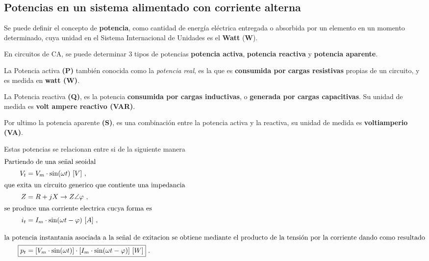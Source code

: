 \subsection{Potencias en un sistema alimentado con corriente alterna}

   Se puede definir el concepto de \textbf{potencia}, como cantidad de energía eléctrica 
  entregada o absorbida por un elemento en un momento determinado, cuya unidad en el Sistema 
  Internacional de Unidades es el \textbf{Watt} (\textbf{W}).

 	En circuitos de CA, se puede determinar 3 tipos de potencias \textbf{potencia activa}, 
     \textbf{potencia reactiva} y \textbf{potencia aparente}.

  La Potencia activa \textbf{(P)} también conocida como la \textit{potencia real}, es la que
  es \textbf{consumida por cargas resistivas} propias de un circuito, y es medida 
  en \textbf{watt (W)}.

  La Potencia reactiva \textbf{(Q)}, es la potencia \textbf{consumida por cargas inductivas},
  o \textbf{generada por cargas capacitivas}. Su unidad de medida es 
  \textbf{volt ampere reactivo (VAR)}.

  Por ultimo la potencia aparente \textbf{(S)}, es una combinación entre la potencia 
  activa y la reactiva, su unidad de medida es \textbf{voltiamperio (VA)}.


  Estas potencias se relacionan entre si de la siguiente manera
        \begin{align}
            \intertext{Partiendo de una señal seoidal}
            V_t   &= V_m \cdot \sin(\omega t)\ [V] \ , \notag \\
            \intertext{que exita un circuito generico que contiente una impedancia}
            Z     &= R + jX \rightarrow Z \angle \varphi \ , \notag \\
            \intertext{se produce una corriente electrica cucya forma es}
            i_t   &= I_m \cdot \sin(\omega t - \varphi)\ [A] \ , \notag \\[3mm]
            \intertext{la potencia instantania asociada a la señal de exitacion se obtiene mediante
            el producto de la tensión por la corriente dando como resultado}
            \hspace{20pt} \Aboxed{p_t  &= [V_m \cdot \sin(\omega t)] \cdot [I_m \cdot \sin(\omega t - \varphi)]\ [W] } \ . \label{eqn:Winst}
         \end{align}

